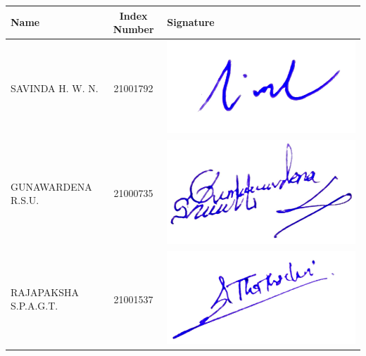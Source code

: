 \begin{table}[ht]
    \begin{tabularx}{\textwidth}{ |X|c|X| }
       \hline
	Name                & Index Number & Signature \\
	\hline
	 SAVINDA H. W. N. & 21001792 &   \includegraphics[scale=0.07]{Images/Signs/nirmal.jpeg}  \\
	\hline
	      GUNAWARDENA R.S.U. & 21000735 &\includegraphics[scale=0.07]{Images/Signs/sandali.jpeg} \\
	\hline
	  RAJAPAKSHA S.P.A.G.T. & 21001537 &  \includegraphics[scale=0.07]{Images/Signs/gayandee.jpeg}   \\

\end{tabularx}
\end{table}
